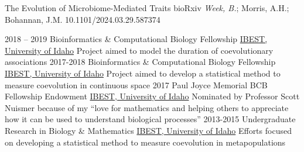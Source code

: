 \documentclass[9pt]{developercv} %
\begin{document}
\vspace{-5 pt}
\begin{publist}
		{The Evolution of Microbiome-Mediated Traits}
		{bioRxiv}
		{\emph{Week, B.}; Morris, A.H.; Bohannan, J.M.}
        {10.1101/2024.03.29.587374}
\end{publist}

\vspace{-10 pt}
\begin{entrylist}
    \entry
        {2018 -- 2019}
        {Bioinformatics \& Computational Biology Fellowship}
        {\href{https://www.iids.uidaho.edu/about.php}{IBEST, University of Idaho}}
        {Project aimed to model the duration of coevolutionary associations}
    \entry
        {2017-2018}
        {Bioinformatics \& Computational Biology Fellowship}
        {\href{https://www.iids.uidaho.edu/about.php}{IBEST, University of Idaho}}
        {Project aimed to develop a statistical method to measure coevolution in continuous space}
    \entry
        {2017}
        {Paul Joyce Memorial BCB Fellowship Endowment}
        {\href{https://www.iids.uidaho.edu/about.php}{IBEST, University of Idaho}}
        {Nominated by Professor Scott Nuismer because of my “love for mathematics and helping others to appreciate how it can be used to understand biological processes”}
    \entry
        {2013-2015}
        {Undergraduate Research in Biology \& Mathematics}
        {\href{https://www.iids.uidaho.edu/about.php}{IBEST, University of Idaho}}
        {Efforts focused on developing a statistical method to measure coevolution in metapopulations}
\end{entrylist}
\end{document}
